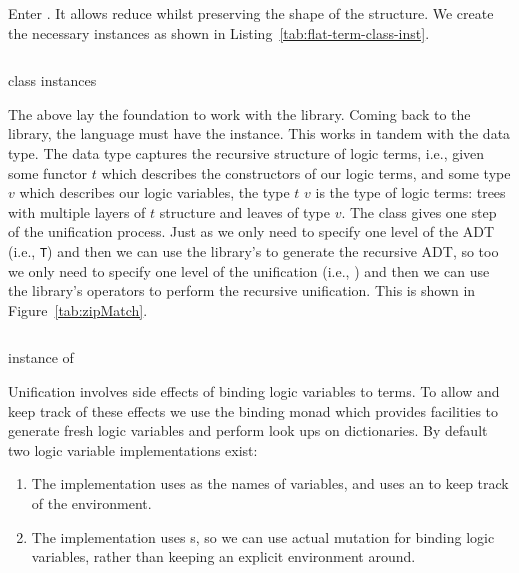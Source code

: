 \documentclass[thesis-solanki.tex]{subfiles}
\begin{document}
Enter .
It allows reduce whilst preserving the shape of the structure.
We create the necessary instances
as shown in Listing~\ref{tab:flat-term-class-inst}.
\begin{code-list}[H]
  \begin{singlespace}
    \inputminted[linenos,lastline=12]{haskell}{haskell-proto1-class-flat.hs}
  \end{singlespace}
  \caption{\protect{} class instances}
  \label{tab:flat-term-class-inst}
\end{code-list}

The above lay the foundation to work with the library.
Coming back to the library, the language must have the  instance.
This works in tandem with the  data type.
The  data type captures the recursive structure of logic terms, i.e., given some functor
\(t\) which describes the constructors of our logic terms, and some type \(v\) which describes our logic variables,
the type  \(t\) \(v\) is the type of logic terms: trees with multiple layers of \(t\)
structure and leaves of type \(v\).
The  class gives one step of the unification process.
Just as we only need to specify one level of the ADT (i.e., \Verb!T!)
and then we can use the library's  to generate the recursive ADT, so too we only need to
specify one level of the unification (i.e., ) and then we can use the library's
operators to perform the recursive unification.
This is shown in Figure~\ref{tab:zipMatch}.
\begin{code-list}[H]
  \begin{singlespace}
    \inputminted[linenos]{haskell}{haskell-proto1-zip-flat.hs}
  \end{singlespace}
  \vspace*{-0.5\baselineskip}
  \caption{\protect{} instance of \protect{}}
  \label{tab:zipMatch}
\end{code-list}

Unification involves side effects of binding logic variables to terms.
To allow and keep track of these effects we use the binding monad which provides facilities to generate fresh logic
variables and perform look ups on dictionaries.
By default two logic variable implementations exist:
\begin{enumerate}
\item
  The  implementation uses  as the names of variables, and uses an
   to keep track of the environment.

\item
  The  implementation uses s, so we can use actual mutation for
  binding logic variables, rather than keeping an explicit environment around.
\end{enumerate}
\end{document}
